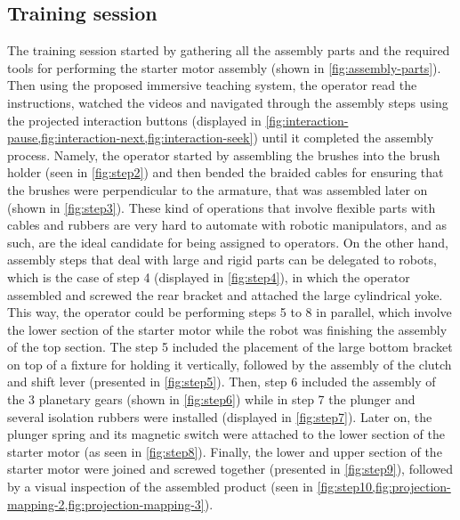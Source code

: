 \subsection{Training session}

The training session started by gathering all the assembly parts and the required tools for performing the starter motor assembly (shown in \cref{fig:assembly-parts}). Then using the proposed immersive teaching system, the operator read the instructions, watched the videos and navigated through the assembly steps using the projected interaction buttons (displayed in \cref{fig:interaction-pause,fig:interaction-next,fig:interaction-seek}) until it completed the assembly process. Namely, the operator started by assembling the brushes into the brush holder (seen in \cref{fig:step2}) and then bended the braided cables for ensuring that the brushes were perpendicular to the armature, that was assembled later on (shown in \cref{fig:step3}). These kind of operations that involve flexible parts with cables and rubbers are very hard to automate with robotic manipulators, and as such, are the ideal candidate for being assigned to operators. On the other hand, assembly steps that deal with large and rigid parts can be delegated to robots, which is the case of step 4 (displayed in \cref{fig:step4}), in which the operator assembled and screwed the rear bracket and attached the large cylindrical yoke. This way, the operator could be performing steps 5 to 8 in parallel, which involve the lower section of the starter motor while the robot was finishing the assembly of the top section. The step 5 included the placement of the large bottom bracket on top of a fixture for holding it vertically, followed by the assembly of the clutch and shift lever (presented in \cref{fig:step5}). Then, step 6 included the assembly of the 3 planetary gears (shown in \cref{fig:step6}) while in step 7 the plunger and several isolation rubbers were installed (displayed in \cref{fig:step7}). Later on, the plunger spring and its magnetic switch were attached to the lower section of the starter motor (as seen in \cref{fig:step8}). Finally, the lower and upper section of the starter motor were joined and screwed together (presented in \cref{fig:step9}), followed by a visual inspection of the assembled product (seen in \cref{fig:step10,fig:projection-mapping-2,fig:projection-mapping-3}).

